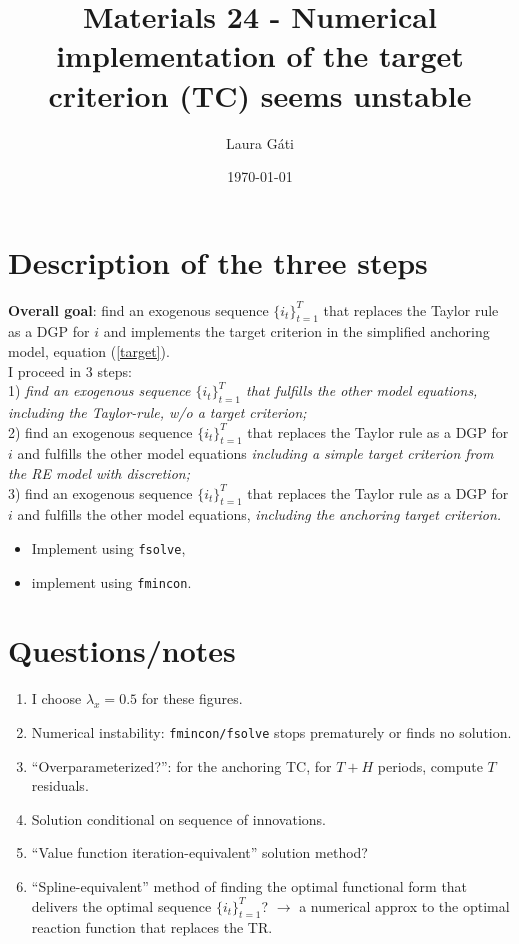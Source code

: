 \documentclass[11pt]{article}
\renewcommand{\[}{\begin{equation}}
\renewcommand{\]}{\end{equation}}
\begin{document}
\linespread{1.0}

\title{Materials 24 - Numerical implementation of the target criterion (TC) seems unstable}
\author{Laura G\'ati} 
\date{\today}
\maketitle


\tableofcontents


\newpage
\section{Description of the three steps}
\textbf{Overall goal}: find an exogenous sequence $\{i_t\}_{t=1}^{T}$ that replaces the Taylor rule as a DGP for $i$ and implements the target criterion in the simplified anchoring model, equation (\ref{target}).\\
I proceed in 3 steps: \\
1) \emph{find an exogenous sequence $\{i_t\}_{t=1}^{T}$ that fulfills the other model equations, including the Taylor-rule, w/o a target criterion;} \\
2) find an exogenous sequence $\{i_t\}_{t=1}^{T}$ that replaces the Taylor rule as a DGP for $i$ and fulfills the other model equations \emph{including a simple target criterion from the RE model with discretion;} \\
3) find an exogenous sequence $\{i_t\}_{t=1}^{T}$ that replaces the Taylor rule as a DGP for $i$ and fulfills the other model equations, \emph{including the anchoring target criterion.} \\
\begin{itemize}
\item Implement using \texttt{fsolve},
\item implement using \texttt{fmincon}.
\end{itemize}


\section{Questions/notes}
\begin{enumerate}
\item I choose $\lambda_x = 0.5$ for these figures.
\item Numerical instability: \texttt{fmincon/fsolve} stops prematurely or finds no solution.
\item ``Overparameterized?'': for the anchoring TC, for $T+H$ periods, compute $T$ residuals.
\item Solution conditional on sequence of innovations.
\item ``Value function iteration-equivalent'' solution method?
\item ``Spline-equivalent'' method of finding the optimal functional form that delivers the optimal sequence $\{i_t\}_{t=1}^T$? $\rightarrow$ a numerical approx to the optimal reaction function that replaces the TR.
\end{enumerate}
\end{document}
